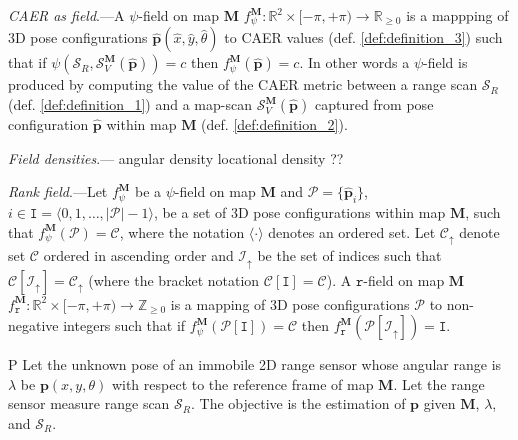 \begin{definition}
  \label{def:definition_4} \textit{CAER as field}.---A $\psi$-field on map
  $\bm{M}$
  $f_{\psi}^{\bm{M}} : \mathbb{R}^2 \times [-\pi, +\pi) \rightarrow \mathbb{R}_{\geq 0}$
  is a mappping of 3D pose configurations
  $\hat{\bm{p}}(\hat{x},\hat{y},\hat{\theta})$ to CAER values (def.
  \ref{def:definition_3}) such that if
  $\psi(\mathcal{S}_R,\mathcal{S}_V^{\bm{M}}(\hat{\bm{p}})) = c$ then
  $f_{\psi}^{\bm{M}}(\hat{\bm{p}}) = c$. In other words a $\psi$-field is
  produced by computing the value of the CAER metric between a range scan
  $\mathcal{S}_R$ (def. \ref{def:definition_1}) and a map-scan
  $\mathcal{S}_V^{\bm{M}}(\hat{\bm{p}})$ captured from pose configuration
  $\hat{\bm{p}}$ within map $\bm{M}$ (def. \ref{def:definition_2}).
\end{definition}

\begin{definition}
  \label{def:definition_5} \textit{Field densities}.---
  angular density
  locational density ??
\end{definition}


\begin{definition}
  \label{def:definition_6} \textit{Rank field}.---Let $f_{\psi}^{\bm{M}}$ be
  a $\psi$-field on map $\bm{M}$ and $\mathcal{P} = \{\hat{\bm{p}}_i\}$,
  $i \in \texttt{I} = \langle 0,1,\dots,|\mathcal{P}|-1 \rangle$, be a set of
  3D pose configurations within map $\bm{M}$, such that
  $f_{\psi}^{\bm{M}}(\mathcal{P}) = \mathcal{C}$, where the notation
  $\langle\cdot\rangle$ denotes an ordered set. Let $\mathcal{C}_\uparrow$
  denote set $\mathcal{C}$ ordered in ascending order and $\mathcal{I}_{\uparrow}$
  be the set of indices such that $\mathcal{C}[\mathcal{I}_{\uparrow}] = \mathcal{C}_\uparrow$
  (where the bracket notation $\mathcal{C}[\texttt{I}] = \mathcal{C}$).
  A $\texttt{r}$-field on map $\bm{M}$
  $f_{\texttt{r}}^{\bm{M}} : \mathbb{R}^2 \times [-\pi, +\pi) \rightarrow \mathbb{Z}_{\geq 0}$
  is a mapping of 3D pose configurations $\mathcal{P}$ to non-negative integers
  such that if $f_{\psi}^{\bm{M}}(\mathcal{P}[\texttt{I}]) = \mathcal{C}$ then
  $f_{\texttt{r}}^{\bm{M}}(\mathcal{P}[\mathcal{I}_\uparrow]) = \texttt{I}$.
\end{definition}

\begin{customprb}{P}
  \label{prob:the_problem}
  Let the unknown pose of an immobile 2D range sensor whose angular range is
  $\lambda$ be $\bm{p}(x,y,\theta)$ with respect to the reference frame of map
  $\bm{M}$. Let the range sensor measure range scan $\mathcal{S}_R$. The
  objective is the estimation of $\bm{p}$ given $\bm{M}$, $\lambda$, and
  $\mathcal{S}_R$.
\end{customprb}
